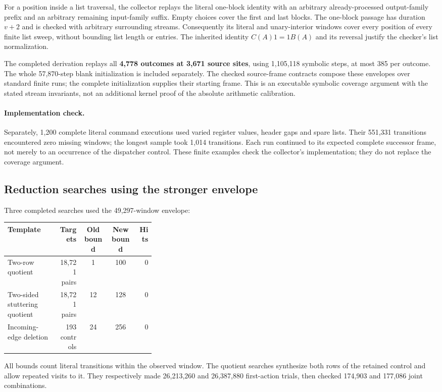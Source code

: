 For a position inside a list traversal, the collector replays the literal
one-block identity with an arbitrary already-processed output-family
prefix and an arbitrary remaining input-family suffix. Empty choices cover
the first and last blocks. The one-block passage has duration $v+2$ and
is checked with arbitrary surrounding streams. Consequently its literal
and unary-interior windows cover every position of every finite list
sweep, without bounding list length or entries. The inherited identity
$C(A)1=1B(A)$ and its reversal justify the checker's list normalization.

The completed derivation replays all \textbf{4,778 outcomes at 3,671 source
sites}, using 1,105,118 symbolic steps, at most 385 per outcome. The
whole 57,870-step blank initialization is included separately. The checked
source-frame contracts compose these envelopes over standard finite runs;
the complete initialization supplies their starting frame. This is an
executable symbolic coverage argument with the stated stream invariants,
not an additional kernel proof of the absolute arithmetic calibration.

\paragraph{Implementation check.}
Separately, 1,200 complete literal command executions used varied register
values, header gaps and spare lists. Their 551,331 transitions encountered
zero missing windows; the longest sample took 1,014 transitions. Each run
continued to its expected complete successor frame, not merely to an
occurrence of the dispatcher control. These finite examples check the
collector's implementation; they do not replace the coverage argument.

\subsection{Reduction searches using the stronger envelope}

Three completed searches used the 49,297-window envelope:
\begin{center}\small
\begin{tabular}{p{0.34\linewidth}rccr}
\toprule
Template & Targets & Old bound & New bound & Hits\\
\midrule
Two-row quotient & 18,721 pairs & 1 & 100 & 0\\
Two-sided stuttering quotient & 18,721 pairs & 12 & 128 & 0\\
Incoming-edge deletion & 193 controls & 24 & 256 & 0\\
\bottomrule
\end{tabular}
\end{center}
All bounds count literal transitions within the observed window. The
quotient searches synthesize both rows of the retained control and allow
repeated visits to it. They respectively made 26,213,260 and 26,387,880
first-action trials, then checked 174,903 and 177,086 joint combinations.


